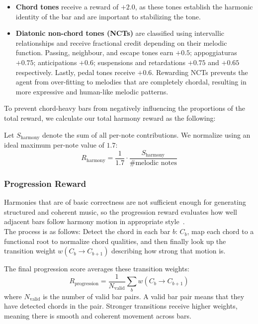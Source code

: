 \documentclass{article}
\begin{document}
\begin{itemize}
    \item \textbf{Chord tones} receive a reward of $+2.0$, as these tones establish the harmonic identity of the bar and are important to stabilizing the tone.
    \item \textbf{Diatonic non-chord tones (NCTs)} are classified using intervallic relationships 
    and receive fractional credit depending on their melodic function. Passing, neighbour, and escape tones earn
$+0.5$; appoggiaturas $+0.75$; anticipations $+0.6$; suspensions and retardations $+0.75$ and $+0.65$
respectively. Lastly, pedal tones receive $+0.6$. Rewarding NCTs prevents the agent from over-fitting to melodies that are completely chordal, resulting in more expressive and human-like melodic patterns.
\end{itemize}

To prevent chord-heavy bars from negatively influencing the proportions of the total reward, we calculate our total harmony reward as the following:

Let $S_{\text{harmony}}$ denote the sum of all per-note contributions. We normalize using an ideal maximum per-note value of $1.7$:
\vspace{-4pt}
\[
R_{\text{harmony}} = \frac{1}{1.7} \cdot \frac{S_{\text{harmony}}}{\#\text{melodic notes}}
\]

\subsubsection{Progression Reward}

Harmonies that are of basic correctness are not sufficient enough for generating structured and coherent music, 
so the progression reward evaluates how well adjacent bars follow harmony motion in appropriate style~\citep{kostka2017tonal}. \\ The process is as follows: Detect the chord in each bar $b$: $C_b$, map each chord to a functional root to normalize chord qualities, and then finally look up the transition weight $w(C_b \rightarrow C_{b+1})$ describing how strong that motion is.

The final progression score averages these transition weights:
\vspace{-4pt}
\[
R_{\text{progression}} =
\frac{1}{N_{\text{valid}}}
\sum_{b} w(C_b \rightarrow C_{b+1})
\]
where $N_{\text{valid}}$ is the number of valid bar pairs. A valid bar pair means that they have detected chords in the pair. Stronger transitions receive higher weights, meaning there is smooth and coherent movement across bars.
\end{document}
